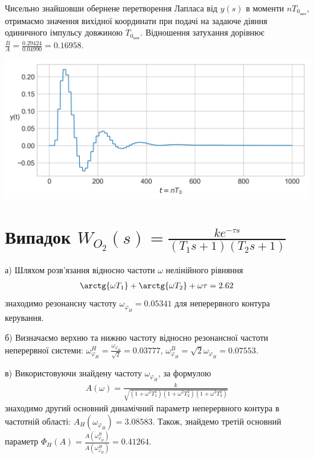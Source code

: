 Чисельно знайшовши обернене перетворення Лапласа від $y(s)$ в моменти $n T_{0_{\text{опт}}}$, 
отримаємо значення вихідної координати при подачі на задаюче діяння одиничного імпульсу довжиною $T_{0_{\text{опт}}}$. 
Відношення затухання дорівнює $\frac{B}{A} = \frac{0.29424}{0.04990} = 0.16958$.
\begin{center}
    \includegraphics[scale=0.9]{pics/transient_process_task_5_1.png}
\end{center}

\section{Випадок \texorpdfstring{$W_{O_2}(s) = \frac{k e^{-\tau s}}{(T_1 s + 1)(T_2 s + 1)}$}{2}}
\label{sec:resonance_2nd_order}
а)\;  Шляхом розв'язання відносно частоти $\omega$ нелінійного рівняння
\begin{gather}
    \arctg{\omega T_1} + \arctg{\omega T_2} + \omega \tau = 2.62
\end{gather}
знаходимо резонансну частоту $\omega_{\varphi_H} = 0.05341$ для неперервного контура керування.

б)\;  Визначаємо верхню та нижню частоту відносно резонансної частоти неперервної системи:
$\omega_{\varphi_H}^H = \frac{\omega_{\varphi_H}}{\sqrt{2}} = 0.03777$, 
$\omega_{\varphi_H}^B = {\sqrt{2}}{\omega_{\varphi_H}} = 0.07553$.

в)\; Використовуючи знайдену частоту $\omega_{\varphi_H}$, за формулою
\begin{gather}
    A(\omega) = \frac{k}{\sqrt{\left(1+\omega^2 T_1^2\right)\left(1+\omega^2 T_2^2\right)\left(1+\omega^2 T_3^2\right)}}
\end{gather}
знаходимо другий основний динамічний параметр неперервного контура в частотній області:
$A_H\left(\omega_{\varphi_H}\right) = 3.08583$. Також, знайдемо третій основний параметр
$\Phi_H(A) = \frac{A\left(\omega_{\varphi_H}^B\right)}{A\left(\omega_{\varphi_H}^H\right)} = 0.41264$.

